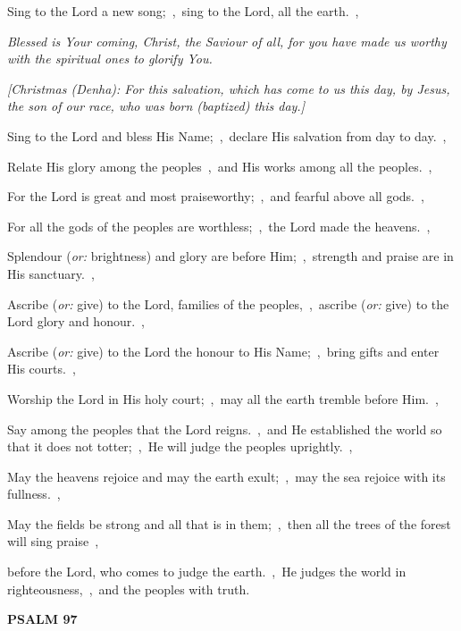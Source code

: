 \documentclass[12pt,twoside,a5paper]{article}
\newcommand{\psalm}[1]{\textbf{PSALM {#1}}\nopagebreak}
\newcommand{\qanona}[1]{{\liturgicalhint{Qanona.} \emph{#1}}}
\newcommand{\translationoption}[1]{\emph{or:} #1}
\begin{document}
\begin{normalparskip}
  Sing to the Lord a new song;~\sep\ sing to the Lord, all the earth.~\sep

  \qanona{Blessed is Your coming, Christ, the Saviour of all, for you have made us worthy with the spiritual ones to glorify You.}

  \emph{[Christmas (Denha): For this salvation, which has come to us this day, by Jesus, the son of our race, who was born (baptized) this day.]}

  Sing to the Lord and bless His Name;~\sep\ declare His salvation from day to day.~\sep

  Relate His glory among the peoples~\sep\ and His works among all the peoples.~\sep

  For the Lord is great and most praiseworthy;~\sep\ and fearful above all gods.~\sep

  For all the gods of the peoples are worthless;~\sep\ the Lord made the heavens.~\sep

  Splendour (\translationoption{brightness}) and glory are before Him;~\sep\ strength and praise are in His sanctuary.~\sep

  Ascribe (\translationoption{give}) to the Lord, families of the peoples,~\sep\ ascribe (\translationoption{give}) to the Lord glory and honour.~\sep

  Ascribe (\translationoption{give}) to the Lord the honour to His Name;~\sep\ bring gifts and enter His courts.~\sep

  Worship the Lord in His holy court;~\sep\ may all the earth tremble before Him.~\sep

  Say among the peoples that the Lord reigns.~\sep\ and He established the world so that it does not totter;~\sep\ He will judge the peoples uprightly.~\sep

  May the heavens rejoice and may the earth exult;~\sep\ may the sea rejoice with its fullness.~\sep

  May the fields be strong and all that is in them;~\sep\ then all the trees of the forest will sing praise~\sep

  before the Lord, who comes to judge the earth.~\sep\ He judges the world in righteousness,~\sep\ and the peoples with truth.
\end{normalparskip}

\psalm{97}
\end{document}
